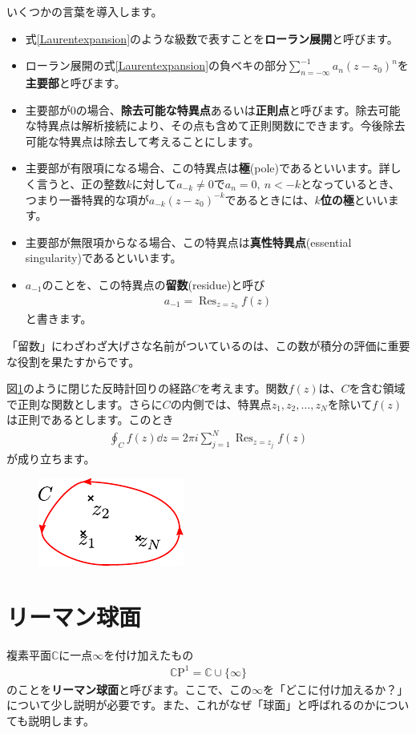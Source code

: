 \documentclass[report,paper=a4, fontsize=12pt, line_length=16cm, number_of_lines=33,dvipdfmx]{jlreq}
\numberwithin{equation}{section}
\newcommand{\Cb}{\mathbb{C}}
\newcommand{\CP}{\Cb \mathrm{P}}
\newcommand{\strong}[1]{\textsf{\bfseries #1}}
\DeclareMathOperator*{\Resi}{\mathrm{Res}}
\begin{document}
いくつかの言葉を導入します。
\begin{itemize}
  \item 式\eqref{Laurentexpansion}のような級数で表すことを\strong{ローラン展開}と呼びます。
  \item ローラン展開の式\eqref{Laurentexpansion}の負ベキの部分$\sum_{n=-\infty}^{-1}a_n(z-z_0)^n$を\strong{主要部}と呼びます。
  \item 主要部が$0$の場合、\strong{除去可能な特異点}あるいは\strong{正則点}と呼びます。除去可能な特異点は解析接続により、その点も含めて正則関数にできます。今後除去可能な特異点は除去して考えることにします。
  \item 主要部が有限項になる場合、この特異点は\strong{極}(pole)であるといいます。詳しく言うと、正の整数$k$に対して$a_{-k}\ne 0$で$a_n=0,\ n<-k$となっているとき、つまり一番特異的な項が$a_{-k}(z-z_0)^{-k}$であるときには、\strong{$k$位の極}といいます。
  \item 主要部が無限項からなる場合、この特異点は\strong{真性特異点}(essential singularity)であるといいます。
  \item $a_{-1}$のことを、この特異点の\strong{留数}(residue)と呼び
  \begin{align}
    a_{-1}=\Resi_{z=z_0}f(z)
  \end{align}
  と書きます。
\end{itemize}

「留数」にわざわざ大げさな名前がついているのは、この数が積分の評価に重要な役割を果たすからです。
\begin{theor}{}{}
  図\ref{fig:residue}のように閉じた反時計回りの経路$C$を考えます。関数$f(z)$は、$C$を含む領域で正則な関数とします。さらに$C$の内側では、特異点$z_1,z_2,\dots,z_N$を除いて$f(z)$は正則であるとします。このとき
  \begin{align}
    \oint_{C}f(z)\dd{z}=2\pi i\sum_{j=1}^{N}\Resi_{z=z_j}f(z)
  \end{align}
  が成り立ちます。
\end{theor}
\begin{figure}[htbp]
  \centering
  \includegraphics{residue.pdf}
  \caption{}
  \label{fig:residue}
\end{figure}


\section{リーマン球面}\label{sec:riemannsphere}
複素平面$\Cb$に一点$\infty$を付け加えたもの
\begin{align}
  \CP^1=\Cb\cup \{\infty\}
\end{align}
のことを\strong{リーマン球面}と呼びます。ここで、この$\infty$を「どこに付け加えるか？」について少し説明が必要です。また、これがなぜ「球面」と呼ばれるのかについても説明します。
\end{document}
